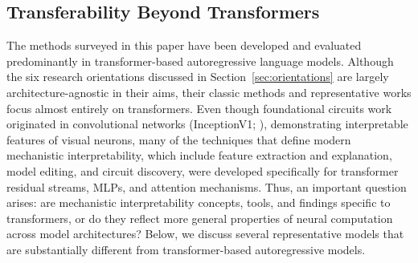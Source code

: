 \subsection{Transferability Beyond Transformers}
\label{sec:non-transformer}

The methods surveyed in this paper have been developed and evaluated predominantly in transformer-based autoregressive language models. Although the six research orientations discussed in Section~\ref{sec:orientations} are largely architecture-agnostic in their aims, their classic methods and representative works focus almost entirely on transformers. Even though foundational circuits work~ originated in convolutional networks (InceptionV1; ), demonstrating interpretable features of visual neurons, many of the techniques that define modern mechanistic interpretability, which include feature extraction and explanation, model editing, and circuit discovery, were developed specifically for transformer residual streams, MLPs, and attention mechanisms. Thus, an important question arises: are mechanistic interpretability concepts, tools, and findings specific to transformers, or do they reflect more general properties of neural computation across model architectures? Below, we discuss several representative models that are substantially different from transformer-based autoregressive models.

